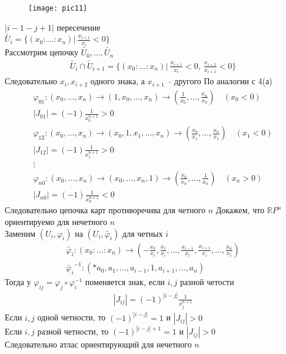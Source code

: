 \begin{enumerate}
	\begin{figure}[!h]
		\texttt{[image: pic11]}
	\end{figure}
	$|i-1-j+1|$ пересечение\\
	$\tilde{U_i} = \{(x_0:\ldots:x_n)|\ \frac{x_{i+1}}{x_i} < 0\}$\\
	Рассмотрим цепочку $\tilde{U_0},\ldots,\tilde{U_n}$\\
	\begin{gather*}
		\tilde{U_i} \cap \tilde{U}_{i+1} = \biggl\{ (x_0:\ldots:x_n)|\ \frac{x_{i+1}}{x_i} < 0,\ \frac{x_{i+2}}{x_{i+1}} < 0\biggr\}
	\end{gather*}
	Следовательно $x_i,x_{i+2}$ одного знака, а $x_{i+1}$ -- другого
	\vskip 0.2in
	По аналогии с 4(а)
	\begin{gather*}
		\varphi_{01}:(x_0,\ldots,x_n) \to (1,x_0,\ldots,x_n) \to \left(\frac{1}{x_0}, \ldots, \frac{x_n}{x_0}\right)\quad (x_0 < 0)\\
		|J_{01}| = (-1) \frac{1}{x_0^{n+1}} > 0\\
		\varphi_{12}: (x_0, \ldots, x_n) \to (x_0, 1, x_1, \ldots, x_n) \to \left(\frac{x_0}{x_1},\ldots,\frac{x_n}{x_1}\right)\quad (x_1 < 0)\\
		|J_{12}| = (-1) \frac{1}{x_1^{n+1}} > 0\\
		\vdots\\
		\varphi_{n0}: (x_0,\ldots,x_n) \to (x_0,\ldots,x_n,1) \to \left(\frac{x_0}{x_n},\ldots,\frac{1}{x_n}\right)\quad (x_n > 0)\\
		|J_{n0}| = (-1) \frac{1}{x_n^{n+1}} < 0
	\end{gather*}
	Следовательно цепочка карт противоречива для четного $n$
	\vskip 0.2in
	Докажем, что $\mathbb{R}P^n$ ориентируемо для нечетного $n$\\
	Заменим $(U_i,\varphi_i)$ на $(U_i,\tilde{\varphi_i})$ для четных $i$
	\begin{gather*}
		\tilde{\varphi_i}: (x_0:\ldots:x_n) \to (-\frac{x_0}{x_i}, \frac{x_1}{x_i},\ldots,\frac{x_{i-1}}{x_i}, \frac{x_{i+1}}{x_i},\ldots,\frac{x_n}{x_i})\\
		\tilde{\varphi_i}^{-1}: (*a_0,a_1,\ldots,a_{i-1},1,a_{i+1},\ldots,a_n)
	\end{gather*}
	Тогда у $\varphi_{ij} = \varphi_j \circ \varphi_i^{-1}$ поменяется знак, если $i,j$ разной четости
	\begin{gather*}
		|J_{ij}| = (-1)^{|i-j|}\frac{1}{x_j^{n+1}}
	\end{gather*}
	Если $i,j$ одной четности, то $(-1)^{|i-j|} = 1$ и $|J_{ij}| > 0$\\
	Если $i,j$ разной четности, то $(-1)^{|i-j| + 1} = 1$ и $|J_{ij}| > 0$\\
	Следовательно атлас ориентирующий для нечетного $n$
\end{enumerate}


